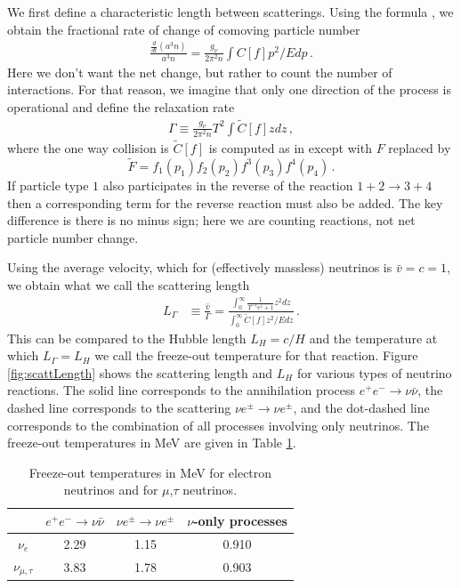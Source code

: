We first define a characteristic length between scatterings. Using the formula , we obtain the fractional rate of change of comoving particle number
\begin{align}
\frac{\frac{d}{dt}(a^3 n)}{a^3n}=\frac{g_\nu}{2\pi^2n}\int C[f]p^2/Edp\,.
\end{align}
Here we don't want the net change, but rather to count the number of interactions. For that reason, we imagine that only one direction of the process is operational and define the relaxation rate
\begin{align}
\Gamma\equiv\frac{g_\nu}{2\pi^2n}T^2\int \tilde C[f]zdz\,,
\end{align}
where the one way collision is $\tilde C[f]$ is computed as in  except with $F$ replaced by 
\begin{equation}
\tilde F=f_1(p_1)f_2(p_2)f^3(p_3)f^4(p_4)\,.
\end{equation}
If particle type $1$ also participates in the reverse of the reaction $1+2\rightarrow 3+4$ then a corresponding term for the reverse reaction must also be added. The key difference is there is no minus sign; here we are counting reactions, not net particle number change.

Using the average velocity, which for (effectively massless) neutrinos is $\bar v=c=1$, we obtain what we call the scattering length
\begin{align}
L_\Gamma&\equiv\frac{\bar v}{\Gamma}=\frac{\int_0^\infty\frac{1}{\Upsilon^{-1}e^z+1}z^2dz}{\int_0^\infty \tilde C[f] z^2/E dz}\,.
\end{align}
This can be compared to the Hubble length $L_H=c/H$ and the temperature at which $L_\Gamma=L_H$ we call the freeze-out temperature for that reaction. Figure \ref{fig:scattLength} shows the scattering length and $L_H$ for various types of neutrino reactions. The solid line corresponds to the annihilation process $e^+e^-\rightarrow \nu\bar\nu$, the dashed line corresponds to the scattering $\nu e^\pm\rightarrow \nu e^\pm$, and the dot-dashed line corresponds to the combination of all processes involving only neutrinos. The freeze-out temperatures in MeV are given in Table \ref{table:freezeoutTemp}.

\begin{table}[ht]
\centering 
\begin{tabular}{|c|c|c|c|}
\hline
 & $e^+e^-\rightarrow \nu\bar\nu$ & $\nu e^\pm\rightarrow \nu e^\pm$ & $\nu$-only processes\\
\hline
$\nu_e$ &2.29 & 1.15&0.910\\
\hline
$\nu_{\mu,\tau}$ &3.83 & 1.78& 0.903\\
\hline
\end{tabular}
\caption{Freeze-out temperatures in MeV for electron neutrinos and for $\mu$,$\tau$ neutrinos.}
\label{table:freezeoutTemp}
\end{table}

